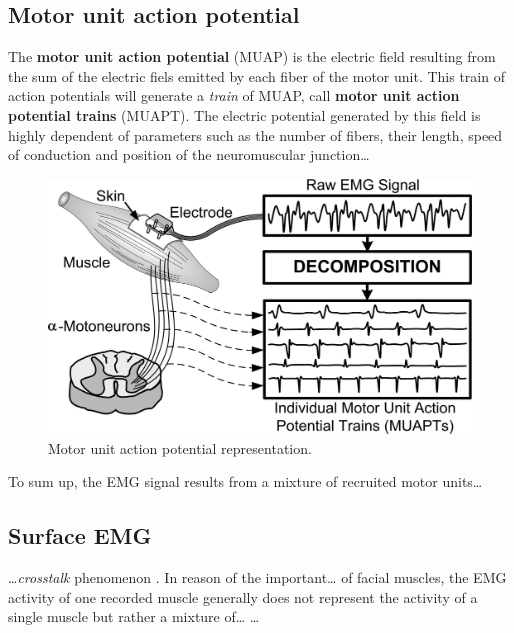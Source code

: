\documentclass[a4paper,11pt,oneside,oldfontcommands]{memoir}
\begin{document}
\subsection{Motor unit action
potential}\label{motor-unit-action-potential}

The \textbf{motor unit action potential} (MUAP) is the electric field
resulting from the sum of the electric fiels emitted by each fiber of
the motor unit. This train of action potentials will generate a
\emph{train} of MUAP, call \textbf{motor unit action potential trains}
(MUAPT). The electric potential generated by this field is highly
dependent of parameters such as the number of fibers, their length,
speed of conduction and position of the neuromuscular junction\ldots{}

\begin{figure}[H]

{\centering \includegraphics[width=1\linewidth]{assets/muap} 

}

\caption{Motor unit action potential representation.}\label{fig:unnamed-chunk-1}
\end{figure}

To sum up, the EMG signal results from a mixture of recruited motor
units\ldots{}

\subsection{Surface EMG}\label{surface-emg}

\ldots{}\emph{crosstalk} phenomenon \citep{de_luca_use_1997}. In reason
of the important\ldots{} of facial muscles, the EMG activity of one
recorded muscle generally does not represent the activity of a single
muscle but rather a mixture of\ldots{} \citet{Rapin2011}\ldots{}
\end{document}
